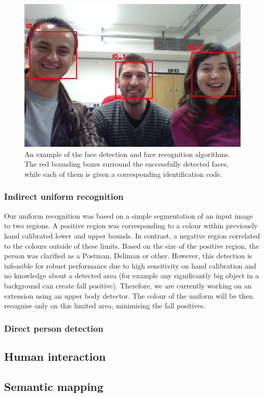 \begin{figure}[!t]
\centering
\includegraphics[width=3.in]{BARC_FaceRec.png}
\caption{An example of the face detection and face recognition algorithms. The red bounding boxes surround the successfully detected faces, while each of them is given a corresponding identification code.}
\label{fig:face}
\end{figure}

\subsubsection{Indirect uniform recognition}

Our uniform recognition was based on a simple segmentation of an input image to two regions. 
A positive region was corresponding to a colour within previously hand calibrated lower and upper bounds. 
In contrast, a negative region correlated to the colours outside of these limits. 
Based on the size of the positive region, the person was clarified as a Postman, Deliman or other. 
However, this detection is infeasible for robust performance due to high sensitivity on hand calibration and no knowledge about a detected area (for example any significantly big object in a background can create fall positive). 
Therefore, we are currently working on an extension using an upper body detector. 
The colour of the uniform will be then recognise only on this limited area, minimising the fall positives.

\subsubsection{Direct person detection}


\subsection{Human interaction}

\subsection{Semantic mapping}







